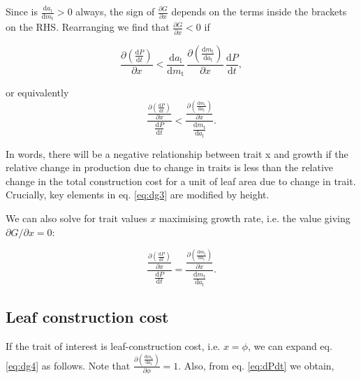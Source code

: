 \documentclass[12pt, a4paper]{article}
\begin{document}
\begin{appendices}
Since is $\frac{\textrm{d}a_\textrm{l}} {\textrm{d}m_\textrm{t}}>0$ always, the sign
of $\frac{\partial G} {\partial x}$ depends on the terms inside the brackets on the
RHS. Rearranging we find that $\frac
{\partial G} {\partial x} < 0$ if

\begin{equation}\label{eq:dg3}
\frac{\partial \left( \frac{ \textrm{d}P} {\textrm{d}t}\right)}{\partial x}
< \frac{\textrm{d}a_\textrm{l}} {\textrm{d}m_\textrm{t}}
\,  \frac{\partial \left(\frac{\textrm{d}m_\textrm{t}} {\textrm{d}a_\textrm{l}}\right)
}{\partial x} \, \frac{ \textrm{d}P} {\textrm{d}t},
\end{equation}

or equivalently
\begin{equation}\label{eq:dg4}
\frac{
\frac{\partial \left( \frac{ \textrm{d}P} {\textrm{d}t}\right)}{\partial x} }
{\frac{ \textrm{d}P} {\textrm{d}t}}
<
\frac{ \frac{\partial \left(\frac{\textrm{d}m_\textrm{t}} {\textrm{d}a_\textrm{l}}\right)
}{\partial x}}{\frac{\textrm{d}m_\textrm{t}} {\textrm{d}a_\textrm{l}}}.
\end{equation}

In words, there will be a negative relationship between trait x and growth if the
relative change in production due to change in traits is less than the relative change
in the total construction cost for a unit of leaf area due to change in trait. Crucially,
key elements in eq. \ref{eq:dg3} are modified by height.

We can also solve for trait values $x$ maximising growth rate, i.e. the value
giving $\partial G /\partial x = 0$:

\begin{equation}\label{eq:max}
\frac{
\frac{\partial \left( \frac{ \textrm{d}P} {\textrm{d}t}\right)}{\partial x} }
{\frac{ \textrm{d}P} {\textrm{d}t}}
=
\frac{ \frac{\partial \left(\frac{\textrm{d}m_\textrm{t}} {\textrm{d}a_\textrm{l}}\right)
}{\partial x}}{\frac{\textrm{d}m_\textrm{t}} {\textrm{d}a_\textrm{l}}}.
\end{equation}

\subsection{Leaf construction cost}

If the trait of interest is leaf-construction cost, i.e. $x=\phi$, we can expand
eq. \ref{eq:dg4} as follows. Note that $\frac{\partial \left(\frac{\textrm{d}m_\textrm
{t}} {\textrm{d}a_\textrm{l}}\right)}{\partial \phi} = 1$. Also, from eq. \ref{eq:dPdt} we obtain,


\end{appendices}
\end{document}
